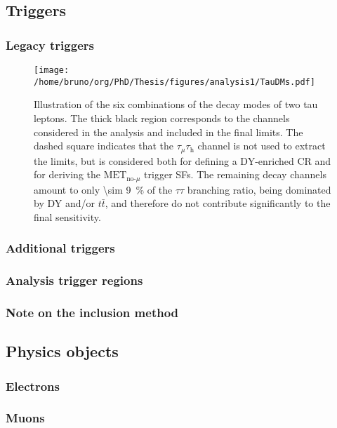 \documentclass[11pt]{article}
\newcommand{\metnomu}{\text{MET}_{\text{no-}\mu}}
\newcommand{\ttbar}{t\bar{t}}
\newcommand{\mumu}{$\tau_{\mu}\tau_{\text{h}}$}
\begin{document}
\subsection{Triggers}
\label{sec:org36dcf9a}
\subsubsection{Legacy triggers}
\label{sec:org7bfeba4}
\label{sec:legacy_triggers}

\begin{figure}
\texttt{[image: /home/bruno/org/PhD/Thesis/figures/analysis1/TauDMs.pdf]}
\caption{\label{fig:tau_decay_modes}Illustration of the six combinations of the decay modes of two tau leptons. The thick black region corresponds to the channels considered in the analysis and included in the final limits. The dashed square indicates that the \mumu{} channel is not used to extract the limits, but is considered both for defining a \ac{DY}-enriched \ac{CR} and for deriving the \(\metnomu\) trigger \acp{SF}. The remaining decay channels amount to only \SI{\sim 9}{\percent} of the \(\tau\tau\) branching ratio, being dominated by \ac{DY} and/or \(\ttbar\), and therefore do not contribute significantly to the final sensitivity.}
\end{figure}
\subsubsection{Additional triggers}
\label{sec:orgb79472a}
\subsubsection{Analysis trigger regions}
\label{sec:org74bd2b6}
\subsubsection{Note on the inclusion method}
\label{sec:org65badea}
\subsection{Physics objects}
\label{sec:org8636830}
\subsubsection{Electrons}
\label{sec:orga065597}
\subsubsection{Muons}
\label{sec:orgc0880d2}
\end{document}

